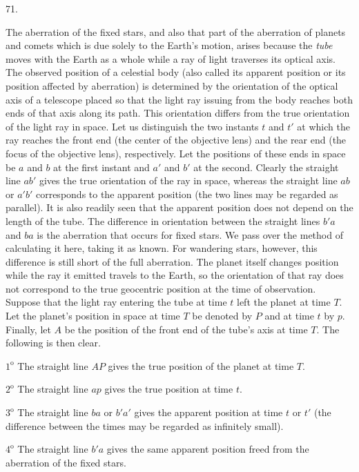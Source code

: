 \par{}\medskip
\hypertarget{native-091-article071}{}
\begin{center}71.\end{center}
The aberration of the fixed stars, and also that part of the aberration of planets and comets which is due solely to the Earth's motion, arises because the \emph{tube} moves with the Earth as a whole while a ray of light traverses its optical axis. The observed position of a celestial body (also called its apparent position or its position affected by aberration) is determined by the orientation of the optical axis of a telescope placed so that the light ray issuing from the body reaches both ends of that axis along its path. This orientation differs from the true orientation of the light ray in space. Let us distinguish the two instants $t$ and $t'$ at which the ray reaches the front end (the center of the objective lens) and the rear end (the focus of the objective lens), respectively. Let the positions of these ends in space be $a$ and $b$ at the first instant and $a'$ and $b'$ at the second. Clearly the straight line $ab'$ gives the true orientation of the ray in space, whereas the straight line $ab$ or $a'b'$ corresponds to the apparent position (the two lines may be regarded as parallel). It is also readily seen that the apparent position does not depend on the length of the tube. The difference in orientation between the straight lines $b'a$ and $ba$ is the aberration that occurs for fixed stars. We pass over the method of calculating it here, taking it as known. For wandering stars, however, this difference is still short of the full aberration. The planet itself changes position while the ray it emitted travels to the Earth, so the orientation of that ray does not correspond to the true geocentric position at the time of observation. Suppose that the light ray entering the tube at time $t$ left the planet at time $T$. Let the planet's position in space at time $T$ be denoted by $P$ and at time $t$ by $p$. Finally, let $A$ be the position of the front end of the tube's axis at time $T$. The following is then clear.
\par $1^{\mathrm{o}}$ The straight line $AP$ gives the true position of the planet at time $T$.
\par $2^{\mathrm{o}}$ The straight line $ap$ gives the true position at time $t$.
\par $3^{\mathrm{o}}$ The straight line $ba$ or $b'a'$ gives the apparent position at time $t$ or $t'$ (the difference between the times may be regarded as infinitely small).
\par $4^{\mathrm{o}}$ The straight line $b'a$ gives the same apparent position freed from the aberration of the fixed stars.

